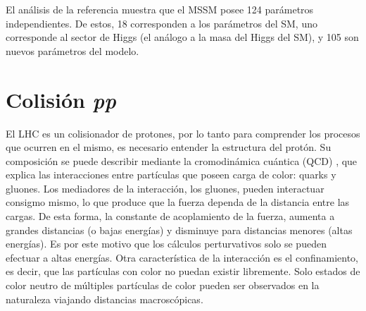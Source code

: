 
 





El análisis de la referencia \cite{Dimopoulos:1995ju} muestra que el MSSM posee 124 parámetros independientes. De estos, 18 corresponden a los parámetros del SM, uno corresponde al sector de Higgs (el análogo a la masa del Higgs del SM), y 105 son nuevos parámetros del modelo.




\section{Colisión \textit{pp}}

El LHC es un colisionador de protones, por lo tanto para comprender los procesos que ocurren en el mismo, es necesario entender la estructura del protón. Su composición se puede describir mediante la cromodinámica cuántica (QCD) \cite{ellis1996}, que explica las interacciones entre partículas que poseen carga de color: quarks y gluones. Los mediadores de la interacción, los gluones, pueden interactuar consigmo mismo, lo que produce que la fuerza dependa de la distancia entre las cargas. De esta forma, la constante de acoplamiento de la fuerza, aumenta a grandes distancias (o bajas energías) y disminuye para distancias menores (altas energías). Es por este motivo que los cálculos perturvativos solo se pueden efectuar a altas energías. Otra característica de la interacción es el confinamiento, es decir, que las partículas con color no puedan existir libremente. Solo estados de color neutro de múltiples partículas de color pueden ser observados en la naturaleza viajando distancias macroscópicas.

